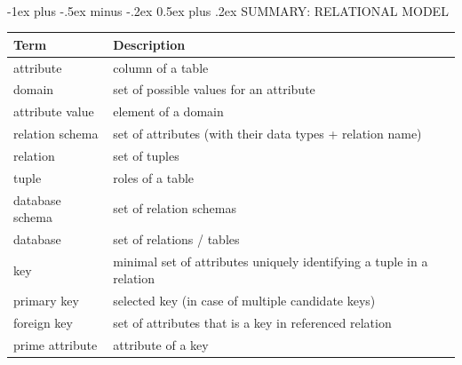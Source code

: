 \documentclass[10pt, landscape]{article}
\makeatletter
\renewcommand{\section}{\@startsection{section}{1}{0mm}%
  {-1ex plus -.5ex minus -.2ex}%
  {0.5ex plus .2ex}%
{\normalfont\large\bfseries}}
\makeatother
\begin{document}
\hrulefill \\

\begin{multicols}{2}
  \section{SUMMARY: RELATIONAL MODEL}
  \begin{center}
    {\begin{tabular}
        {ll}
        \rowcolor{cyan!10}
        \textbf{Term} & \textbf{Description} \\ \hline
        attribute & column of a table \\
        domain & set of possible values for an attribute \\
        attribute value & element of a domain \\ 
        relation schema & set of attributes (with their data types + relation name) \\
        relation & set of tuples \\
        tuple & roles of a table \\
        database schema & set of relation schemas \\
        database & set of relations / tables \\ 
        key & minimal set of attributes uniquely identifying a tuple in a relation \\
        primary key & selected key (in case of multiple candidate keys) \\
        foreign key & set of attributes that is a key in referenced relation \\
        prime attribute & attribute of a key \\
        \hline
      \end{tabular}
    }
  \end{center}
\end{multicols}
\end{document}
